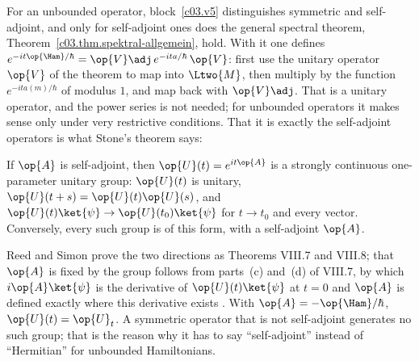 \begin{vertiefung}[id=c04.v2,
    titel={Unbounded Hamiltonians},
    wozu={In the core $\op{\Ham}$ is a Hermitian matrix, and $e^{-it\op{\Ham}/\hbar}$ is a sum over
      the eigenvectors. The most important Hamiltonians, however, are unbounded. Here is why
      ``Hermitian'' is then no longer enough, and what takes its place.},
    voraussetzung={Section~\ref{c04.s2}; blocks~\ref{c03.v5} and~\ref{c03.v7} (symmetric and
      self-adjoint, spectral theorem). The core does not need this block; Chapters~5 and~9 take
      the subject up again.},
    zurueck={For an unbounded Hamiltonian it has to say: self-adjoint. Exactly the self-adjoint
      operators generate unitary time evolutions.}]
  For an unbounded operator, block~\ref{c03.v5} distinguishes symmetric and self-adjoint, and only
  for self-adjoint ones does the general spectral theorem,
  Theorem~\ref{c03.thm.spektral-allgemein}, hold. With it one defines
  $e^{-it\op{\Ham}/\hbar} = \op{V}\adj\, e^{-ita/\hbar}\, \op{V}$: first use the unitary operator
  $\op{V}$ of the theorem to map into $\Ltwo{M}$, then multiply by the function
  $e^{-ita(m)/\hbar}$ of modulus $1$, and map back with $\op{V}\adj$. That is a unitary operator, and the power series is
  not needed; for unbounded operators it makes sense only under very restrictive conditions. That
  it is exactly the self-adjoint operators is what Stone's theorem says:

  \begin{theorem}[Stone]\label{c04.thm.stone}
    If $\op{A}$ is self-adjoint, then $\op{U}(t) = e^{it\op{A}}$ is a strongly continuous
    one-parameter unitary group: $\op{U}(t)$ is unitary, $\op{U}(t+s) = \op{U}(t)\op{U}(s)$, and
    $\op{U}(t)\ket{\psi} \to \op{U}(t_0)\ket{\psi}$ for $t \to t_0$ and every vector. Conversely,
    every such group is of this form, with a self-adjoint $\op{A}$.
  \end{theorem}

  Reed and Simon prove the two directions as Theorems VIII.7 and VIII.8; that $\op{A}$ is fixed by
  the group follows from parts~(c) and~(d) of VIII.7, by which $i\op{A}\ket{\psi}$ is the
  derivative of $\op{U}(t)\ket{\psi}$ at $t = 0$ and $\op{A}$ is defined exactly where this
  derivative exists
  . With $\op{A} = -\op{\Ham}/\hbar$, $\op{U}(t) = \op{U}_t$.
  A symmetric operator that is not self-adjoint generates no such group; that is the reason why
  it has to say ``self-adjoint'' instead of ``Hermitian'' for unbounded Hamiltonians.
\end{vertiefung}

